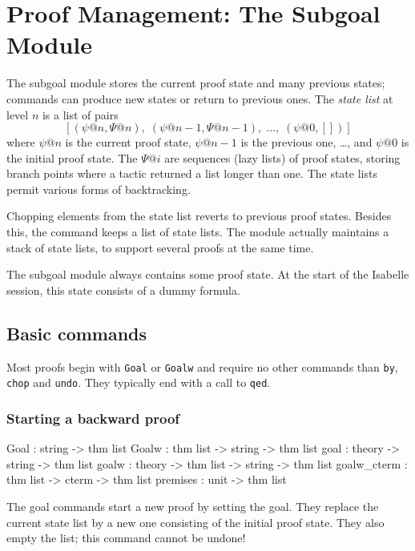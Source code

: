 \chapter{Proof Management: The Subgoal Module}

The subgoal module stores the current proof state and
many previous states; commands can produce new states or return to previous
ones.  The {\em state list\/} at level $n$ is a list of pairs
\[ [(\psi@n,\Psi@n),\; (\psi@{n-1},\Psi@{n-1}),\; \ldots,\; (\psi@0,[])] \]
where $\psi@n$ is the current proof state, $\psi@{n-1}$ is the previous
one, \ldots, and $\psi@0$ is the initial proof state.  The $\Psi@i$ are
sequences (lazy lists) of proof states, storing branch points where a
tactic returned a list longer than one.  The state lists permit various
forms of backtracking.

Chopping elements from the state list reverts to previous proof states.
Besides this, the  command keeps a list of state lists.  The
module actually maintains a stack of state lists, to support several
proofs at the same time.

The subgoal module always contains some proof state.  At the start of the
Isabelle session, this state consists of a dummy formula.


\section{Basic commands}
Most proofs begin with \texttt{Goal} or \texttt{Goalw} and require no other
commands than \texttt{by}, \texttt{chop} and \texttt{undo}.  They typically end
with a call to \texttt{qed}.
\subsection{Starting a backward proof}
\begin{ttbox}
Goal        :                       string -> thm list
Goalw       :           thm list -> string -> thm list
goal        : theory ->             string -> thm list 
goalw       : theory -> thm list -> string -> thm list 
goalw_cterm :           thm list -> cterm  -> thm list 
premises    : unit -> thm list
\end{ttbox}

The goal commands start a new proof by setting the goal.  They replace
the current state list by a new one consisting of the initial proof
state.  They also empty the  list; this command cannot
be undone!

